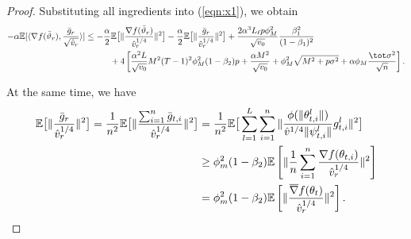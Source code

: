 \documentclass[nohyperref]{article}
\theoremstyle{plain}
\theoremstyle{definition}
\theoremstyle{remark}
\begin{document}
\begin{proof}
Substituting all ingredients into (\ref{eqn:x1}), we obtain
\begin{align}\notag
    -\alpha \mathbb E[\langle \nabla f(\bar \vartheta_r),\frac{\bar g_r}{\sqrt{\hat v_r}} \rangle] &\leq -\frac{\alpha}{2}\mathbb E\big[\Vert \frac{\nabla f(\bar\vartheta_r) }{\hat v_r^{1/4}}\Vert^2 \big]-\frac{\alpha}{2}\mathbb E\big[\Vert \frac{\bar g_r }{\hat v_r^{1/4}}\Vert^2 \big]+\frac{2\alpha^3 L_\ell p\phi_M^2}{ \sqrt{v_0}}\frac{\beta_1^2}{(1-\beta_1)^2} \\\notag
    &\hspace{0.4in}  + 4 \left[ \frac{\alpha^2 L}{\sqrt{v_0}} M^2 (T-1)^2 \phi_M^2 (1-\beta_2)p + \frac{\alpha M^2}{\sqrt{v_0}}+\phi_M^2\sqrt{M^2+p\sigma^2} +\alpha \phi_M \frac{\tot \sigma^2}{\sqrt{n}}\right].
\end{align}


At the same time, we have
\begin{align}\notag
    \mathbb E\big[\Vert \frac{\bar g_r }{\hat v_r^{1/4}}\Vert^2\big]=\frac{1}{n^2}\mathbb E\big[\Vert \frac{\sum_{i=1}^n \bar g_{t,i}}{\hat v_r^{1/4}}\Vert^2 \big] &=\frac{1}{n^2}\mathbb E\big[ \sum_{l=1}^L \sum_{i=1}^n \Vert  \frac{\phi(\Vert \theta_{t,i}^l\Vert)}{\hat v^{1/4} \Vert \psi_{t,i}^l\Vert}g_{t,i}^l \Vert^2 \big] \\
    &\geq \phi_m^2(1-\beta_2) \mathbb E\left[ \Vert \frac{1}{n}\sum_{i=1}^n \frac{\nabla f(\theta_{t,i})}{\hat v^{1/4}_r} \Vert^2 \right]\\\notag
    &=\phi_m^2(1-\beta_2) \mathbb E\left[ \Vert  \frac{\overline\nabla f(\theta_{t})}{\hat v^{1/4}_r} \Vert^2 \right]. \notag
\end{align}




\end{proof}
\end{document}
